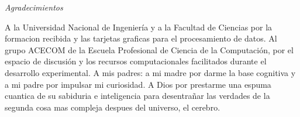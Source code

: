 \documentclass[12pt,spanish, singlespacing, openany]{MastersDoctoralThesis}
\begin{document}
\newpage
\thispagestyle{empty}
\mbox{}
\newpage
\begin{center}
{\huge \textit{Agradecimientos}}\\[1.5cm]
\end{center}


A la Universidad Nacional de Ingeniería y a la Facultad de Ciencias por la formacion recibida y las tarjetas graficas para el procesamiento de datos. Al grupo ACECOM de la Escuela Profesional de Ciencia de la Computación, por el espacio de discusión y los recursos computacionales facilitados durante el desarrollo experimental. A mis padres: a mi madre por darme la base cognitiva y a mi padre por impulsar mi curiosidad. A Dios por prestarme una espuma cuantica de su sabiduria e inteligencia para desentrañar las verdades de la segunda cosa mas compleja despues del universo, el cerebro.

\mainmatter 
\pagestyle{thesis}














\appendix



\end{document}
